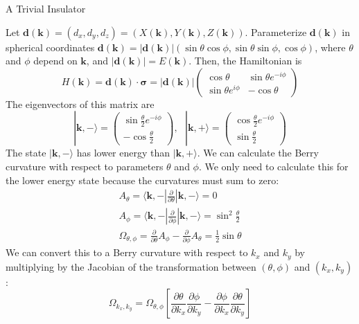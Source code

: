 \documentclass[a4paper,12pt]{article}
\renewcommand{\vec}[1]{\boldsymbol{\mathbf{#1}}}
\begin{document}
\begin{section}{A Trivial Insulator}

Let $\vec{d}(\vec{k})=(d_x,d_y,d_z)=(X(\vec{k}),Y(\vec{k}),Z(\vec{k}))$.  Parameterize $\vec{d}(\vec{k})$ in spherical coordinates $\vec{d}(\vec{k})=|\vec{d}(\vec{k})| (\sin{\theta} \cos{\phi},\sin{\theta} \sin{\phi}, \cos{\phi})$, where $\theta$ and $\phi$ depend on $\vec{k}$, and $|\vec{d}(\vec{k})|=E(\vec{k})$.  Then, the Hamiltonian is
\begin{equation}
H(\vec{k})=\vec{d}(\vec{k}) \cdot \vec{\sigma}=|\vec{d}(\vec{k})| \left(
\begin{array}{cc}
\cos{\theta} & \sin{\theta} e^{-i \phi}  \\
\sin{\theta} e^{i \phi} & -\cos{\theta}
\end{array}
\right)
\end{equation}
The eigenvectors of this matrix are \cite{berry_electronic}
\begin{equation}
| \vec{k}, - \rangle = \left(
\begin{array}{c}
\sin{\frac{\theta}{2}} e^{-i \phi} \\
-\cos{\frac{\theta}{2}}
\end{array}
\right), \text{ }
| \vec{k}, + \rangle = \left(
\begin{array}{c}
\cos{\frac{\theta}{2}} e^{-i \phi} \\
\sin{\frac{\theta}{2}}
\end{array}
\right)
\end{equation}
The state $| \vec{k}, - \rangle$ has lower energy than $| \vec{k}, + \rangle$.  We can calculate the Berry curvature with respect to parameters $\theta$ and $\phi$.  We only need to calculate this for the lower energy state because the curvatures must sum to zero:
\begin{eqnarray}
A_{\theta} = \langle \vec{k}, - | \frac{\partial}{\partial \theta} | \vec{k}, - \rangle = 0 \\
A_{\phi} = \langle \vec{k}, - | \frac{\partial}{\partial \phi} | \vec{k}, - \rangle = \sin^2 \frac{\theta}{2} \\
\Omega_{\theta,\phi} = \frac{\partial}{\partial \theta} A_{\phi} - \frac{\partial}{\partial \phi} A_{\theta} = \frac{1}{2} \sin{\theta}
\end{eqnarray}
We can convert this to a Berry curvature with respect to $k_x$ and $k_y$ by multiplying by the Jacobian of the transformation between $(\theta,\phi)$ and $(k_x,k_y)$:
\begin{equation}
\Omega_{k_x,k_y}=\Omega_{\theta,\phi} \left[ \frac{\partial \theta}{\partial k_x} \frac{\partial \phi}{\partial k_y} - \frac{\partial \phi}{\partial k_x} \frac{\partial \theta}{\partial k_y} \right]

\end{equation}
\end{section}
\end{document}
